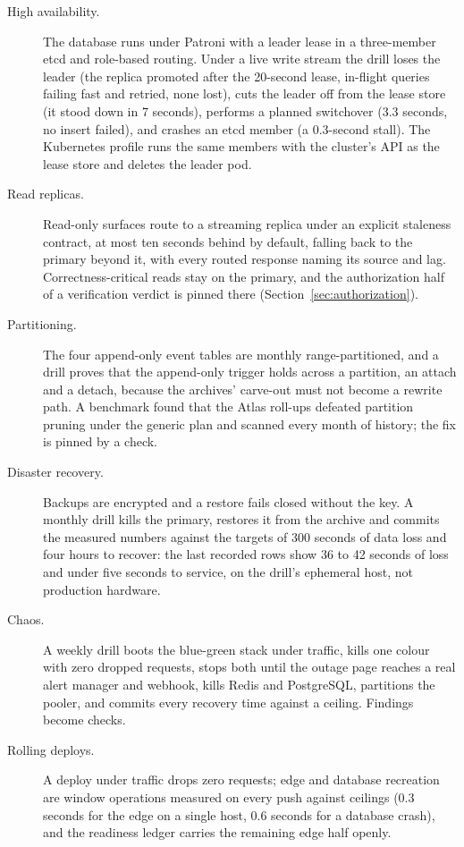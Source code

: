 \begin{description}
  \item[High availability.] The database runs under Patroni with a leader lease in a three-member
    etcd and role-based routing. Under a live write stream the drill loses the leader (the replica
    promoted after the 20-second lease, in-flight queries failing fast and retried, none lost), cuts
    the leader off from the lease store (it stood down in 7 seconds), performs a planned switchover
    (3.3 seconds, no insert failed), and crashes an etcd member (a 0.3-second stall). The Kubernetes
    profile runs the same members with the cluster's API as the lease store and deletes the leader
    pod. \sImpl
  \item[Read replicas.] Read-only surfaces route to a streaming replica under an explicit
    staleness contract, at most ten seconds behind by default, falling back to the primary beyond
    it, with every routed response naming its source and lag. Correctness-critical reads stay on
    the primary, and the authorization half of a verification verdict is pinned there
    (Section~\ref{sec:authorization}). \sImpl
  \item[Partitioning.] The four append-only event tables are monthly range-partitioned, and a
    drill proves that the append-only trigger holds across a partition, an attach and a detach,
    because the archives' carve-out must not become a rewrite path. A benchmark found that the
    Atlas roll-ups defeated partition pruning under the generic plan and scanned every month of
    history; the fix is pinned by a check. \sImpl
  \item[Disaster recovery.] Backups are encrypted and a restore fails closed without the key.
    A monthly drill kills the primary, restores it from the archive and commits the measured numbers
    against the targets of 300 seconds of data loss and four hours to recover: the last recorded
    rows show 36 to 42 seconds of loss and under five seconds to service, on the drill's ephemeral
    host, not production hardware. \sImpl
  \item[Chaos.] A weekly drill boots the blue-green stack under traffic, kills one colour with zero
    dropped requests, stops both until the outage page reaches a real alert manager and webhook,
    kills Redis and PostgreSQL, partitions the pooler, and commits every recovery time against a
    ceiling. Findings become checks. \sImpl
  \item[Rolling deploys.] A deploy under traffic drops zero requests; edge and database recreation
    are window operations measured on every push against ceilings (0.3 seconds for the edge on a
    single host, 0.6 seconds for a database crash), and the readiness ledger carries the remaining
    edge half openly. \sImpl
\end{description}

